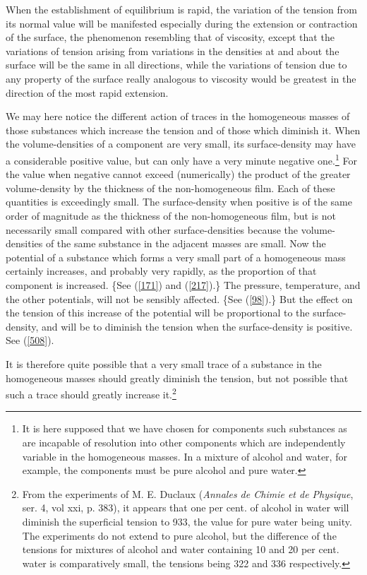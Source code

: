\documentclass[12pt]{article}
\begin{document}
{When the establishment of equilibrium is rapid, the variation of the tension from its normal value will be manifested especially during the extension or contraction of the surface, the phenomenon resembling that of viscosity, except that the variations of tension arising from variations in the densities at and about the surface will be the same in all directions, while the variations of tension due to any property of the surface really analogous to viscosity would be greatest in the direction of the most rapid extension.

We may here notice the different action of traces in the homogeneous masses of those substances which increase the tension and of those which diminish it. When the volume-densities of a component are very small, its surface-density may have a considerable positive value, but can only have a very minute negative one.\footnote{It is here supposed that we have chosen for components such substances as are incapable of resolution into other components which are independently variable in the homogeneous masses. In a mixture of alcohol and water, for example, the components must be pure alcohol and pure water.} For the value when negative cannot exceed (numerically) the product of the greater volume-density by the thickness of the non-homogeneous film. Each of these quantities is exceedingly small. The surface-density when positive is of the same order of magnitude as the thickness of the non-homogeneous film, but is not necessarily small compared with other surface-densities because the volume-densities of the same substance in the adjacent masses are small. Now the potential of a substance which forms a very small part of a homogeneous mass certainly increases, and probably very rapidly, as the proportion of that component is increased. \{See (\ref{171}) and (\ref{217}).\} The pressure, temperature, and the other potentials, will not be sensibly affected.  \{See (\ref{98}).\}  But the effect on the tension of this increase of the potential will be proportional to the surface-density, and will be to diminish the tension when the surface-density is positive. See (\ref{508}).} It is therefore quite possible that a very small trace of a substance in the homogeneous masses should greatly diminish the tension, but not possible that such a trace should greatly increase it.\footnote{From the experiments of M. E. Duclaux (\textit{Annales de Chimie et de Physique}, ser. 4, vol xxi, p. 383), it appears that one per cent. of alcohol in water will diminish the superficial tension to 933, the value for pure water being unity. The experiments do not extend to pure alcohol, but the difference of the tensions for mixtures of alcohol and water containing 10 and 20 per cent. water is comparatively small, the tensions being 322 and 336 respectively.\par
}
\end{document}
